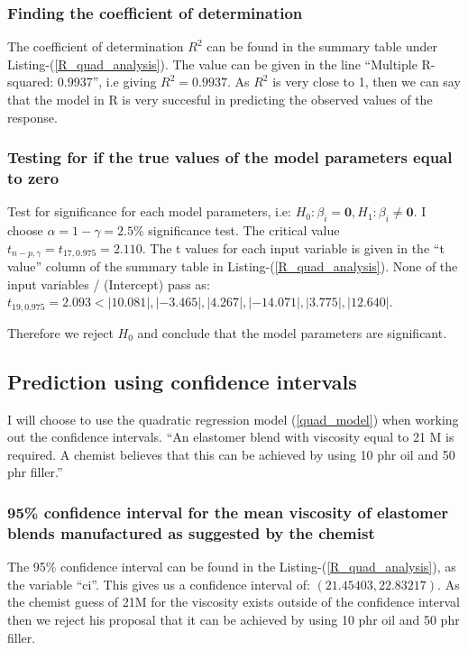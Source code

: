 \documentclass[12pt]{article}
\newcommand{\vect}[1]{\boldsymbol{#1}}
\begin{document}
\subsubsection{Finding the coefficient of determination}
The coefficient of determination $R^2$ can be found in the summary table under Listing-(\ref{R_quad_analysis}). The value can be given in the line \enquote{Multiple R-squared:  0.9937}, i.e giving $R^2=0.9937$. As $R^2$ is very close to 1, then we can say that the model in R is very succesful in predicting the observed values of the response.


\subsubsection{Testing for if the true values of the model parameters equal to zero}
Test for significance for each model parameters, i.e: $H_0: \beta_i = \vect{0}, H_1: \beta_i \neq \vect{0}$. I choose $\alpha = 1-\gamma = 2.5\%$ significance test. The critical value $t_{n-p, \gamma}=t_{17, 0.975} = 2.110$. The t values for each input variable is given in the \enquote{t value} column of the summary table in Listing-(\ref{R_quad_analysis}). None of the input variables / (Intercept) pass as:
$t_{19, 0.975} = 2.093 < |10.081|, |-3.465|, |4.267|, |-14.071|, |3.775|, |12.640|$. \par
Therefore we reject $H_0$ and conclude that the model parameters are significant.


\subsection{Prediction using confidence intervals}
I will choose to use the quadratic regression model (\ref{quad_model}) when working out the confidence intervals. \enquote{An elastomer blend with viscosity equal to 21 M is required. A chemist believes that this can be achieved by using 10 phr oil and 50 phr filler.}

\subsubsection{95\% confidence interval for the mean viscosity of elastomer blends manufactured as suggested by the chemist}
The 95\% confidence interval can be found in the Listing-(\ref{R_quad_analysis}), as the variable \enquote{ci}. This gives us a confidence interval of: $(21.45403, 22.83217)$. As the chemist guess of 21M for the viscosity exists outside of the confidence interval then we reject his proposal that it can be achieved by using 10 phr oil and 50 phr filler.
\end{document}
